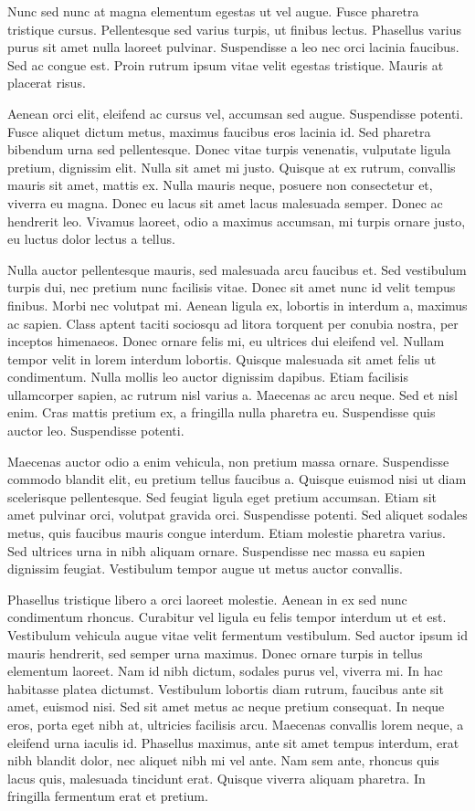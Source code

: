 \documentclass{homework}
\begin{document}
Nunc sed nunc at magna elementum egestas ut vel augue. Fusce pharetra tristique cursus. Pellentesque sed varius turpis, ut finibus lectus. Phasellus varius purus sit amet nulla laoreet pulvinar. Suspendisse a leo nec orci lacinia faucibus. Sed ac congue est. Proin rutrum ipsum vitae velit egestas tristique. Mauris at placerat risus.

Aenean orci elit, eleifend ac cursus vel, accumsan sed augue. Suspendisse potenti. Fusce aliquet dictum metus, maximus faucibus eros lacinia id. Sed pharetra bibendum urna sed pellentesque. Donec vitae turpis venenatis, vulputate ligula pretium, dignissim elit. Nulla sit amet mi justo. Quisque at ex rutrum, convallis mauris sit amet, mattis ex. Nulla mauris neque, posuere non consectetur et, viverra eu magna. Donec eu lacus sit amet lacus malesuada semper. Donec ac hendrerit leo. Vivamus laoreet, odio a maximus accumsan, mi turpis ornare justo, eu luctus dolor lectus a tellus.

Nulla auctor pellentesque mauris, sed malesuada arcu faucibus et. Sed vestibulum turpis dui, nec pretium nunc facilisis vitae. Donec sit amet nunc id velit tempus finibus. Morbi nec volutpat mi. Aenean ligula ex, lobortis in interdum a, maximus ac sapien. Class aptent taciti sociosqu ad litora torquent per conubia nostra, per inceptos himenaeos. Donec ornare felis mi, eu ultrices dui eleifend vel. Nullam tempor velit in lorem interdum lobortis. Quisque malesuada sit amet felis ut condimentum. Nulla mollis leo auctor dignissim dapibus. Etiam facilisis ullamcorper sapien, ac rutrum nisl varius a. Maecenas ac arcu neque. Sed et nisl enim. Cras mattis pretium ex, a fringilla nulla pharetra eu. Suspendisse quis auctor leo. Suspendisse potenti.

Maecenas auctor odio a enim vehicula, non pretium massa ornare. Suspendisse commodo blandit elit, eu pretium tellus faucibus a. Quisque euismod nisi ut diam scelerisque pellentesque. Sed feugiat ligula eget pretium accumsan. Etiam sit amet pulvinar orci, volutpat gravida orci. Suspendisse potenti. Sed aliquet sodales metus, quis faucibus mauris congue interdum. Etiam molestie pharetra varius. Sed ultrices urna in nibh aliquam ornare. Suspendisse nec massa eu sapien dignissim feugiat. Vestibulum tempor augue ut metus auctor convallis.

Phasellus tristique libero a orci laoreet molestie. Aenean in ex sed nunc condimentum rhoncus. Curabitur vel ligula eu felis tempor interdum ut et est. Vestibulum vehicula augue vitae velit fermentum vestibulum. Sed auctor ipsum id mauris hendrerit, sed semper urna maximus. Donec ornare turpis in tellus elementum laoreet. Nam id nibh dictum, sodales purus vel, viverra mi. In hac habitasse platea dictumst. Vestibulum lobortis diam rutrum, faucibus ante sit amet, euismod nisi. Sed sit amet metus ac neque pretium consequat. In neque eros, porta eget nibh at, ultricies facilisis arcu. Maecenas convallis lorem neque, a eleifend urna iaculis id. Phasellus maximus, ante sit amet tempus interdum, erat nibh blandit dolor, nec aliquet nibh mi vel ante. Nam sem ante, rhoncus quis lacus quis, malesuada tincidunt erat. Quisque viverra aliquam pharetra. In fringilla fermentum erat et pretium.
\end{document}
